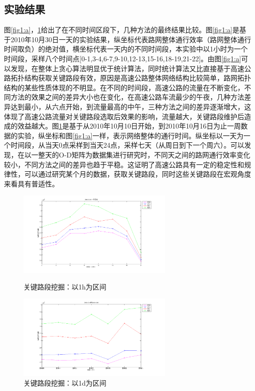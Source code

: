 			\subsection{实验结果}
				图\ref{fig1:a}，\ref{fig1:b}给出了在不同时间区段下，几种方法的最终结果比较。图\ref{fig1:a}是基于2010年10月30日一天的实验结果，纵坐标代表路网整体通行效率（路网整体通行时间取负）的绝对值，横坐标代表一天内的不同时间段，本实验中以1小时为一个时间段，采样八个时间点[0-1,3-4,6-7,9-10,12-13,15-16,18-19,21-22]。由图\ref{fig1:a}可以发现，在整体上贪心算法明显优于统计算法，同时统计算法又比直接基于高速公路拓扑结构获取关键路段有效，原因是高速公路整体网络结构比较简单，路网拓扑结构的某些性质体现的不明显。在不同的时间段，高速公路的流量在不断变化，不同方法的效果之间的差异大小也在变化，在高速公路车流最少的午夜，几种方法差异达到最小，从六点开始，到流量最高的中午，三种方法之间的差异逐渐增大，这体现了高速公路流量对关键路段选取后效果的影响，流量越大，关键路段维护后造成的效益越大。图\ref{fig1:b}是基于从2010年10月10日开始，到2010年10月16日为止一周数据的实验，纵坐标和图\ref{fig1:a}一样，表示网络整体的通行时间。纵坐标以一天为一个时间段，从当天0点采样到当天24点，采样七天（从周日到下一个周六）。可以发现，在以一整天的O-D矩阵为数据集进行研究时，不同天之间的路网通行效率变化较小，不同方法之间的差异也趋于平稳。这证明了高速公路具有一定的稳定性和规律性，可以通过研究某个月的数据，获取关键路段，同时这些关键路段在宏观角度来看具有普适性。



				\begin{figure}[h]
				\begin{minipage}{0.5\linewidth}
					\centering
					\includegraphics[width=3.0in]{picture/one_day_5}
					\caption{关键路段挖掘：以1h为区间}
					\label{fig1:a}
				\end{minipage}%
				\begin{minipage}{0.5\linewidth}
					\centering
					\includegraphics[width=3.0in]{picture/one_week_5}
					\caption{关键路段挖掘：以1d为区间}
					\label{fig1:b}
				\end{minipage}
				\end{figure}

